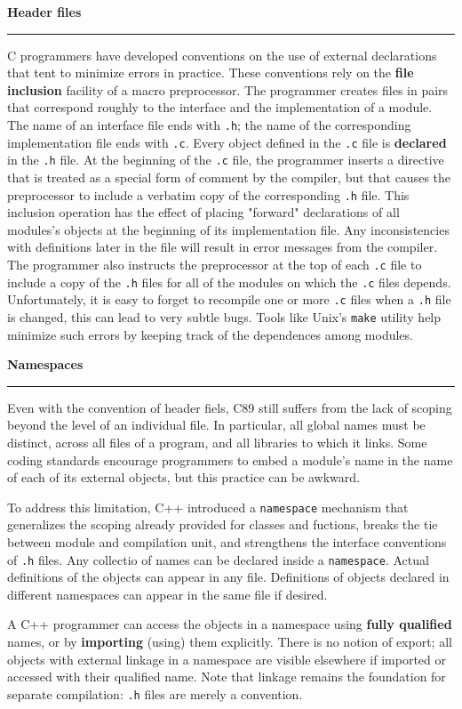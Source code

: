 \vskip 12pt

{\bf Header files}
\vskip 1mm
\hrule

\vskip 6pt
C programmers have developed conventions on the use of external declarations that tent to minimize errors in practice. These conventions rely on the {\bf file inclusion} facility of a macro preprocessor. The programmer creates files in pairs that correspond roughly to the interface and the implementation of a module. The name of an interface file ends with {\tt .h}; the name of the corresponding implementation file ends with {\tt .c}. Every object defined in the {\tt .c} file is {\bf declared} in the {\tt .h} file. At the beginning of the {\tt .c} file, the programmer inserts a directive that is treated as a special form of comment by the compiler, but that causes the preprocessor to include a verbatim copy of the corresponding {\tt .h} file. This inclusion operation has the effect of placing "forward" declarations of all modules's objects at the beginning of its implementation file. Any inconsistencies with definitions later in the file will result in  error messages from the compiler. The programmer also instructs the preprocessor at the top of each {\tt .c} file to include a copy of the {\tt .h} files for all of the modules on which the {\tt .c} files  depends. Unfortunately, it is easy to forget to recompile one or more {\tt .c} files when a {\tt .h} file is changed, this can lead to very subtle bugs. Tools like Unix's {\tt make} utility help minimize such errors by keeping track of the dependences among modules.

\vskip 48pt

{\bf Namespaces}
\vskip 1mm
\hrule

\vskip 6pt
Even with the convention of header fiels, C89 still suffers from the lack of scoping beyond the level of an individual file. In particular, all global names must be distinct, across all files of a program, and all libraries to which it links. Some coding standards encourage programmers to embed a module's name in the name of each of its external objects, but this practice can be awkward.

\vskip 6pt
To address this limitation, C++ introduced a {\tt namespace} mechanism that generalizes the scoping already provided for classes and fuctions, breaks the tie between module and compilation unit, and strengthens the interface conventions of {\tt .h} files. Any collectio of names can be declared inside a {\tt namespace}. Actual definitions of the objects can appear in any file. Definitions of objects declared in different namespaces can appear in the same file if desired.

\vskip 6pt
A C++ programmer can access the objects in a namespace using {\bf fully qualified} names, or by {\bf importing} (using) them explicitly. There is no notion of export; all objects with external linkage in a namespace are visible elsewhere if imported or accessed with their qualified name. Note that linkage remains the foundation for separate compilation: {\tt .h} files are merely a convention.

\vfill\eject
\bye
